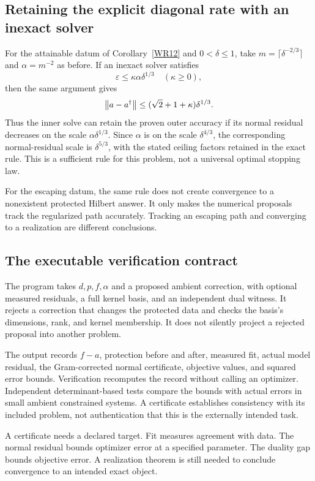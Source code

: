 \subsection{Retaining the explicit diagonal rate with an inexact solver}
For the attainable datum of Corollary~\ref{WR12} and $0<\delta\le1$, take $m=\lceil\delta^{-2/3}\rceil$ and $\alpha=m^{-2}$ as before. If an inexact solver satisfies
\[
 \varepsilon\le\kappa\alpha\delta^{1/3}
 \quad(\kappa\ge0),
\]
then the same argument gives
\[
 \left\lVert a-a^\dagger\right\rVert\le(\sqrt2+1+\kappa)\delta^{1/3}.
\]
Thus the inner solve can retain the proven outer accuracy if its normal residual decreases on the scale $\alpha\delta^{1/3}$. Since $\alpha$ is on the scale $\delta^{4/3}$, the corresponding normal-residual scale is $\delta^{5/3}$, with the stated ceiling factors retained in the exact rule. This is a sufficient rule for this problem, not a universal optimal stopping law.


For the escaping datum, the same rule does not create convergence to a nonexistent protected Hilbert answer. It only makes the numerical proposals track the regularized path accurately. Tracking an escaping path and converging to a realization are different conclusions.

\subsection{The executable verification contract}
The program takes $d,p,f,\alpha$ and a proposed ambient correction, with optional measured residuals, a full kernel basis, and an independent dual witness. It rejects a correction that changes the protected data and checks the basis's dimensions, rank, and kernel membership. It does not silently project a rejected proposal into another problem.

The output records $f-a$, protection before and after, measured fit, actual model residual, the Gram-corrected normal certificate, objective values, and squared error bounds. Verification recomputes the record without calling an optimizer. Independent determinant-based tests compare the bounds with actual errors in small ambient constrained systems. A certificate establishes consistency with its included problem, not authentication that this is the externally intended task.

\begin{insight}
A certificate needs a declared target. Fit measures agreement with data. The normal residual bounds optimizer error at a specified parameter. The duality gap bounds objective error. A realization theorem is still needed to conclude convergence to an intended exact object.
\end{insight}
